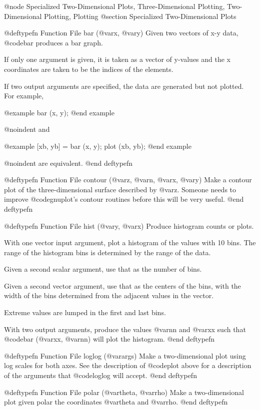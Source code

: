 @node Specialized Two-Dimensional Plots, Three-Dimensional Plotting, Two-Dimensional Plotting, Plotting
@section Specialized Two-Dimensional Plots

@deftypefn {Function File} {} bar (@var{x}, @var{y})
Given two vectors of x-y data, @code{bar} produces a bar graph.

If only one argument is given, it is taken as a vector of y-values
and the x coordinates are taken to be the indices of the elements.

If two output arguments are specified, the data are generated but
not plotted.  For example,

@example
bar (x, y);
@end example

@noindent
and

@example
[xb, yb] = bar (x, y);
plot (xb, yb);
@end example

@noindent
are equivalent.
@end deftypefn

@deftypefn {Function File} {} contour (@var{z}, @var{n}, @var{x}, @var{y})
Make a contour plot of the three-dimensional surface described by
@var{z}.  Someone needs to improve @code{gnuplot}'s contour routines
before this will be very useful.
@end deftypefn

@deftypefn {Function File} {} hist (@var{y}, @var{x})
Produce histogram counts or plots.

With one vector input argument, plot a histogram of the values with
10 bins.  The range of the histogram bins is determined by the range
of the data.

Given a second scalar argument, use that as the number of bins.

Given a second vector argument, use that as the centers of the bins,
with the width of the bins determined from the adjacent values in
the vector.

Extreme values are lumped in the first and last bins.

With two output arguments, produce the values @var{nn} and @var{xx} such
that @code{bar (@var{xx}, @var{nn})} will plot the histogram.
@end deftypefn

@deftypefn {Function File} {} loglog (@var{args})
Make a two-dimensional plot using log scales for both axes.  See the
description of @code{plot} above for a description of the arguments that
@code{loglog} will accept.
@end deftypefn

@deftypefn {Function File} {} polar (@var{theta}, @var{rho})
Make a two-dimensional plot given polar the coordinates @var{theta} and
@var{rho}.
@end deftypefn


